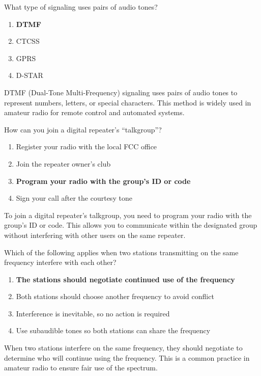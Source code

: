\begin{tcolorbox}[colback=gray!10!white,colframe=black!75!black,title={T2B06}]
    What type of signaling uses pairs of audio tones?
    \begin{enumerate}[label=\Alph*),noitemsep]
        \item \textbf{DTMF}
        \item CTCSS
        \item GPRS
        \item D-STAR
    \end{enumerate}
\end{tcolorbox}
DTMF (Dual-Tone Multi-Frequency) signaling uses pairs of audio tones to represent numbers, letters, or special characters. This method is widely used in amateur radio for remote control and automated systems.


\begin{tcolorbox}[colback=gray!10!white,colframe=black!75!black,title={T2B07}]
    How can you join a digital repeater’s “talkgroup”?
    \begin{enumerate}[label=\Alph*),noitemsep]
        \item Register your radio with the local FCC office
        \item Join the repeater owner’s club
        \item \textbf{Program your radio with the group’s ID or code}
        \item Sign your call after the courtesy tone
    \end{enumerate}
\end{tcolorbox}
To join a digital repeater's talkgroup, you need to program your radio with the group's ID or code. This allows you to communicate within the designated group without interfering with other users on the same repeater.


\begin{tcolorbox}[colback=gray!10!white,colframe=black!75!black,title={T2B08}]
    Which of the following applies when two stations transmitting on the same frequency interfere with each other?
    \begin{enumerate}[label=\Alph*),noitemsep]
        \item \textbf{The stations should negotiate continued use of the frequency}
        \item Both stations should choose another frequency to avoid conflict
        \item Interference is inevitable, so no action is required
        \item Use subaudible tones so both stations can share the frequency
    \end{enumerate}
\end{tcolorbox}
When two stations interfere on the same frequency, they should negotiate to determine who will continue using the frequency. This is a common practice in amateur radio to ensure fair use of the spectrum.

